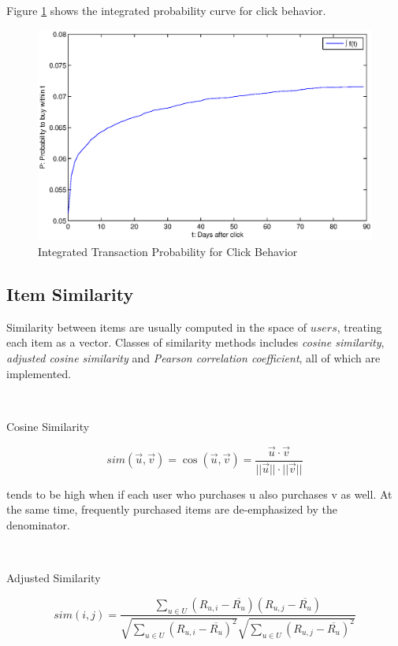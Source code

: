 \documentclass[11pt,a4paper,titlepage]{article}
\begin{document}
Figure \ref{fig:click-curve} shows the integrated probability curve for click behavior.

\begin{figure}[!h]
\centering
\includegraphics[width=\linewidth]{./click_curve.eps}
\caption{Integrated Transaction Probability for Click Behavior}
\label{fig:click-curve}
\end{figure}


\subsection{Item Similarity}


Similarity between items are usually computed in the space of $users$, treating each item as a vector. Classes of similarity methods includes \emph{cosine similarity}, \emph{adjusted cosine similarity} and \emph{Pearson correlation coefficient}, all of which are implemented.

~

Cosine Similarity

\begin{equation}
sim(\vec{u},\vec{v}) = \cos(\vec{u},\vec{v}) = \frac{\vec{u}\cdot \vec{v}}{||\vec{u}|| \cdot ||\vec{v}||}
\end{equation}

tends to be high when if each user who purchases u also purchases v as well. At the same time, frequently purchased items are de-emphasized by the denominator.

~

Adjusted Similarity\cite{sarwar2001item}

\begin{equation}
sim(i,j) = \frac{\sum_{u \in U}(R_{u,i} - \overline{R_u})(R_{u,j} - \overline{R_u})}{\sqrt{\sum_{u \in U}(R_{u,i} - \overline{R_u})^2}\sqrt{\sum_{u \in U}(R_{u,j} - \overline{R_u})^2}}
\end{equation}
\end{document}
